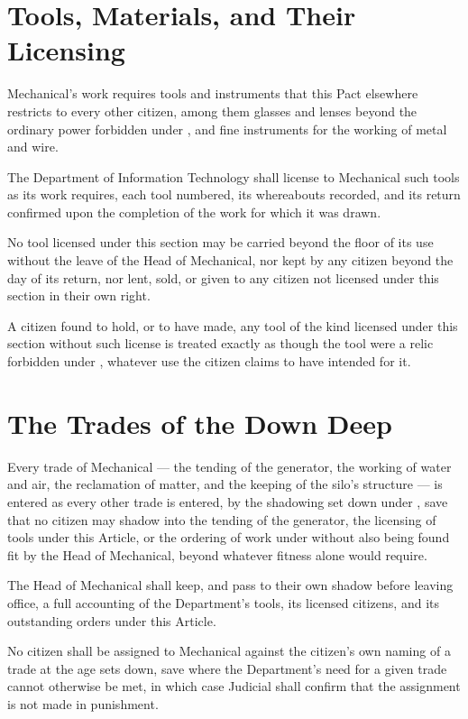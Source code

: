 \section{Tools, Materials, and Their Licensing}
\label{sec:mechanical:tools-materials-and-their-licensing}

Mechanical's work requires tools and instruments that this Pact elsewhere restricts to every other citizen, among them glasses and lenses beyond the ordinary power forbidden under , and fine instruments for the working of metal and wire.

\begin{clauses}
\item The Department of Information Technology shall license to Mechanical such tools as its work requires, each tool numbered, its whereabouts recorded, and its return confirmed upon the completion of the work for which it was drawn.
\item No tool licensed under this section may be carried beyond the floor of its use without the leave of the Head of Mechanical, nor kept by any citizen beyond the day of its return, nor lent, sold, or given to any citizen not licensed under this section in their own right.
\item A citizen found to hold, or to have made, any tool of the kind licensed under this section without such license is treated exactly as though the tool were a relic forbidden under , whatever use the citizen claims to have intended for it.
\end{clauses}

\section{The Trades of the Down Deep}
\label{sec:mechanical:trades-of-the-down-deep}

Every trade of Mechanical --- the tending of the generator, the working of water and air, the reclamation of matter, and the keeping of the silo's structure --- is entered as every other trade is entered, by the shadowing set down under , save that no citizen may shadow into the tending of the generator, the licensing of tools under this Article, or the ordering of work under  without also being found fit by the Head of Mechanical, beyond whatever fitness  alone would require.

\begin{clauses}
\item The Head of Mechanical shall keep, and pass to their own shadow before leaving office, a full accounting of the Department's tools, its licensed citizens, and its outstanding orders under this Article.
\item No citizen shall be assigned to Mechanical against the citizen's own naming of a trade at the age  sets down, save where the Department's need for a given trade cannot otherwise be met, in which case Judicial shall confirm that the assignment is not made in punishment.
\end{clauses}

